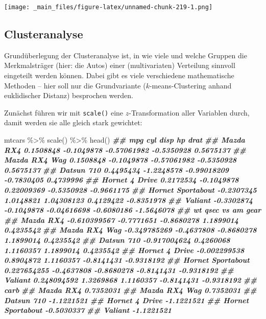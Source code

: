 \documentclass[
  ngerman,
]{article}
\newenvironment{Shaded}{\begin{snugshade}}{\end{snugshade}}
\newcommand{\DocumentationTok}[1]{\textcolor[rgb]{0.56,0.35,0.01}{\textbf{\textit{#1}}}}
\newcommand{\FunctionTok}[1]{\textcolor[rgb]{0.00,0.00,0.00}{#1}}
\newcommand{\NormalTok}[1]{#1}
\newcommand{\SpecialCharTok}[1]{\textcolor[rgb]{0.00,0.00,0.00}{#1}}
\begin{document}
\texttt{[image: \_main\_files/figure-latex/unnamed-chunk-219-1.png]}

\hypertarget{clusteranalyse-1}{%
\subsection{Clusteranalyse}\label{clusteranalyse-1}}

Grundüberlegung der Clusteranalyse ist, in wie viele und welche Gruppen die Merkmalsträger (hier: die Autos) einer (multivariaten) Verteilung sinnvoll eingeteilt werden können. Dabei gibt es viele verschiedene mathematische Methoden -- hier soll nur die Grundvariante (\(k\)-means-Clustering anhand euklidischer Distanz) besprochen werden.

Zunächst führen wir mit \texttt{scale()} eine \(z\)-Transformation aller Variablen durch, damit werden sie alle gleich stark gewichtet:

\begin{Shaded}
\begin{Highlighting}[]
\NormalTok{mtcars }\SpecialCharTok{\%\textgreater{}\%}
  \FunctionTok{scale}\NormalTok{() }\SpecialCharTok{\%\textgreater{}\%}
  \FunctionTok{head}\NormalTok{()}
\DocumentationTok{\#\#                          mpg        cyl        disp         hp       drat}
\DocumentationTok{\#\# Mazda RX4          0.1508848 {-}0.1049878 {-}0.57061982 {-}0.5350928  0.5675137}
\DocumentationTok{\#\# Mazda RX4 Wag      0.1508848 {-}0.1049878 {-}0.57061982 {-}0.5350928  0.5675137}
\DocumentationTok{\#\# Datsun 710         0.4495434 {-}1.2248578 {-}0.99018209 {-}0.7830405  0.4739996}
\DocumentationTok{\#\# Hornet 4 Drive     0.2172534 {-}0.1049878  0.22009369 {-}0.5350928 {-}0.9661175}
\DocumentationTok{\#\# Hornet Sportabout {-}0.2307345  1.0148821  1.04308123  0.4129422 {-}0.8351978}
\DocumentationTok{\#\# Valiant           {-}0.3302874 {-}0.1049878 {-}0.04616698 {-}0.6080186 {-}1.5646078}
\DocumentationTok{\#\#                             wt       qsec         vs         am       gear}
\DocumentationTok{\#\# Mazda RX4         {-}0.610399567 {-}0.7771651 {-}0.8680278  1.1899014  0.4235542}
\DocumentationTok{\#\# Mazda RX4 Wag     {-}0.349785269 {-}0.4637808 {-}0.8680278  1.1899014  0.4235542}
\DocumentationTok{\#\# Datsun 710        {-}0.917004624  0.4260068  1.1160357  1.1899014  0.4235542}
\DocumentationTok{\#\# Hornet 4 Drive    {-}0.002299538  0.8904872  1.1160357 {-}0.8141431 {-}0.9318192}
\DocumentationTok{\#\# Hornet Sportabout  0.227654255 {-}0.4637808 {-}0.8680278 {-}0.8141431 {-}0.9318192}
\DocumentationTok{\#\# Valiant            0.248094592  1.3269868  1.1160357 {-}0.8141431 {-}0.9318192}
\DocumentationTok{\#\#                         carb}
\DocumentationTok{\#\# Mazda RX4          0.7352031}
\DocumentationTok{\#\# Mazda RX4 Wag      0.7352031}
\DocumentationTok{\#\# Datsun 710        {-}1.1221521}
\DocumentationTok{\#\# Hornet 4 Drive    {-}1.1221521}
\DocumentationTok{\#\# Hornet Sportabout {-}0.5030337}
\DocumentationTok{\#\# Valiant           {-}1.1221521}
\end{Highlighting}
\end{Shaded}
\end{document}
